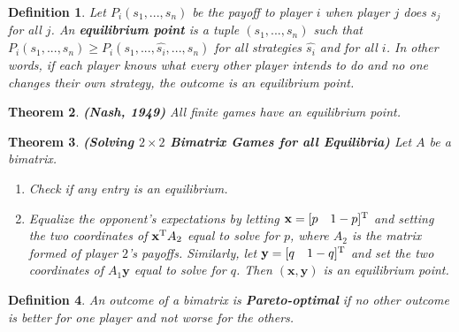 \documentclass{article}
\theoremstyle{colontheorem}
\newtheorem{theorem}{Theorem}[section]
\newtheorem{definition}[theorem]{Definition}
\newcommand{\T}{^\textnormal{T}}
\newenvironment{Theorem}
{
	\begin{mdframed}[backgroundcolor=TheoremOrange!10]
	\begin{theorem}
}
{
	\end{theorem}
	\end{mdframed}
	
	\vspace{.15in}
}
\newenvironment{Def}
{
	\begin{mdframed}[backgroundcolor=DefGreen!10]
	\begin{definition}
}
{
	\end{definition}
	\end{mdframed}
	
	\vspace{.15in}
}
\begin{document}
\begin{Def}
	
	Let $P_i(s_1, ..., s_n)$ be the payoff to player $i$ when player $j$ does $s_j$ for all $j$. An \textbf{equilibrium point} is a tuple $(s_1, ..., s_n)$ such that $P_i(s_1, ..., s_n) \geq P_i(s_1, ..., \hat{s_i}, ..., s_n)$ for all strategies $\hat{s_i}$ and for all $i$. In other words, if each player knows what every other player intends to do and no one changes their own strategy, the outcome is an equilibrium point.
	
\end{Def}



\begin{Theorem}
	
	\textbf{(Nash, 1949)} All finite games have an equilibrium point.
	
\end{Theorem}



\begin{Theorem}
	
	\textbf{(Solving $2 \times 2$ Bimatrix Games for all Equilibria)} Let $A$ be a bimatrix.
	
	\begin{enumerate}
		
		\item Check if any entry is an equilibrium.
		
		\item Equalize the opponent's expectations by letting $\mathbf{x} = [p\ \ \ 1-p]\T$ and setting the two coordinates of $\mathbf{x}\T A_2$ equal to solve for $p$, where $A_2$ is the matrix formed of player $2$'s payoffs. Similarly, let $\mathbf{y} = [q\ \ \ 1-q]\T$ and set the two coordinates of $A_1 \mathbf{y}$ equal to solve for $q$. Then $(\mathbf{x}, \mathbf{y})$ is an equilibrium point.
		
	\end{enumerate}
	
\end{Theorem}



\begin{Def}
	
	An outcome of a bimatrix is \textbf{Pareto-optimal} if no other outcome is better for one player and not worse for the others.
	
\end{Def}
\end{document}

